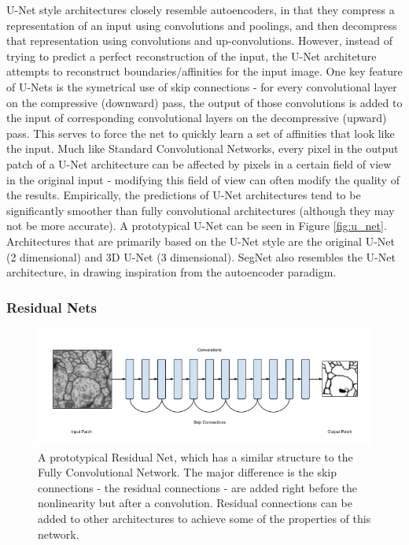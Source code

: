 U-Net style architectures closely resemble autoencoders, in that they compress a representation of an input using convolutions and poolings, and then decompress that representation using convolutions and up-convolutions.  However, instead of trying to predict a perfect reconstruction of the input, the U-Net architeture attempts to reconstruct boundaries/affinities for the input image. One key feature of U-Nets is the symetrical use of skip connections - for every convolutional layer on the compressive (downward) pass, the output of those convolutions is added to the input of corresponding convolutional layers on the decompressive (upward) pass. This serves to force the net to quickly learn a set of affinities that look like the input. Much like Standard Convolutional Networks, every pixel in the output patch of a U-Net architecture can be affected by pixels in a certain field of view in the original input - modifying this field of view can often modify the quality of the results. Empirically, the predictions of U-Net architectures tend to be significantly smoother than fully convolutional architectures (although they may not be more accurate). A prototypical U-Net can be seen in Figure \ref{fig:u_net}. Architectures that are primarily based on the U-Net style are the original U-Net (2 dimensional) and 3D U-Net (3 dimensional). SegNet also resembles the U-Net architecture, in drawing inspiration from the autoencoder paradigm.

\subsubsection{Residual Nets}

\begin{figure}
\centering
\includegraphics[width=\textwidth]{img/Residual_Network.png}
\caption[A prototypical Residual Net]{A prototypical Residual Net, which has a similar structure to the Fully Convolutional Network. The major difference is the skip connections - the residual connections - are added right before the nonlinearity but after a convolution. Residual connections can be added to other architectures to achieve some of the properties of this network.}
\label{fig:residual_net}
\end{figure}

